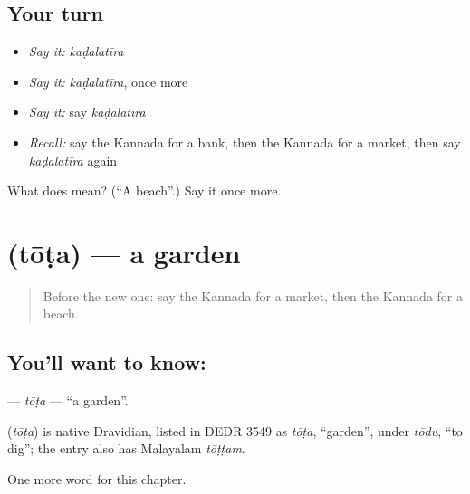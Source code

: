 \subsection*{Your turn}
\begin{itemize}
\raggedright
  \item \emph{Say it:} \emph{kaḍalatīra}
  \item \emph{Say it:} \emph{kaḍalatīra}, once more
  \item \emph{Say it:} say \emph{kaḍalatīra}
  \item \emph{Recall:} say the Kannada for a bank, then the Kannada for a market, then say \emph{kaḍalatīra} again
\end{itemize}

\begin{tcolorbox}[breakable,colback=teal!4,colframe=teal!35!black,title={Before you move on}]
What does  mean? (\textquotedblleft{}A beach\textquotedblright{}.) Say it once more.
\end{tcolorbox}
\section[\texorpdfstring{\kn{ತೋಟ} (tōṭa)}{ತೋಟ (tōṭa)}]{ (tōṭa) — a garden}

\label{lesson:KA-C110-tota}



\begin{quote}
Before the new one: say the Kannada for a market, then the Kannada for a beach.
\end{quote}

\subsection*{You'll want to know: }
\textbf{} — \emph{tōṭa} — \textquotedblleft{}a garden\textquotedblright{}.

\begin{cousinweb}
\textbf{} (\emph{tōṭa}) is native Dravidian, listed in DEDR 3549 as \emph{tōṭa}, \textquotedblleft{}garden\textquotedblright{}, under \emph{tōḍu}, \textquotedblleft{}to dig\textquotedblright{}; the entry also has Malayalam \emph{tōṭṭam}.
\end{cousinweb}

\begin{grammarlens}[title={What you've built}]
One more word for this chapter.
\end{grammarlens}

